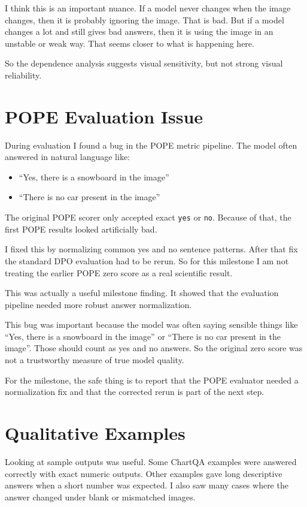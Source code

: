 \documentclass[11pt]{article}
\begin{document}
I think this is an important nuance.
If a model never changes when the image changes, then it is probably ignoring the image.
That is bad.
But if a model changes a lot and still gives bad answers, then it is using the image in an unstable or weak way.
That seems closer to what is happening here.

So the dependence analysis suggests visual sensitivity, but not strong visual reliability.

\section*{POPE Evaluation Issue}
During evaluation I found a bug in the POPE metric pipeline.
The model often answered in natural language like:

\begin{itemize}
    \item ``Yes, there is a snowboard in the image''
    \item ``There is no car present in the image''
\end{itemize}

The original POPE scorer only accepted exact \texttt{yes} or \texttt{no}.
Because of that, the first POPE results looked artificially bad.

I fixed this by normalizing common yes and no sentence patterns.
After that fix the standard DPO evaluation had to be rerun.
So for this milestone I am not treating the earlier POPE zero score as a real scientific result.

This was actually a useful milestone finding.
It showed that the evaluation pipeline needed more robust answer normalization.

This bug was important because the model was often saying sensible things like ``Yes, there is a snowboard in the image'' or ``There is no car present in the image''.
Those should count as yes and no answers.
So the original zero score was not a trustworthy measure of true model quality.

For the milestone, the safe thing is to report that the POPE evaluator needed a normalization fix and that the corrected rerun is part of the next step.

\section*{Qualitative Examples}
Looking at sample outputs was useful.
Some ChartQA examples were answered correctly with exact numeric outputs.
Other examples gave long descriptive answers when a short number was expected.
I also saw many cases where the answer changed under blank or mismatched images.
\end{document}
